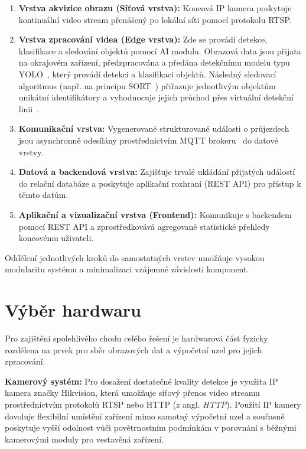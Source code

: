 \documentclass[male,czech,api_bc]{kitheses}
\begin{document}
\begin{enumerate}
    \item \textbf{Vrstva akvizice obrazu (Síťová vrstva):} Koncová IP kamera poskytuje kontinuální video stream přenášený po lokální síti pomocí protokolu \acs{RTSP}.
    \item \textbf{Vrstva zpracování videa (Edge vrstva):} Zde se provádí detekce, klasifikace a sledování objektů pomocí AI modulu. Obrazová data jsou přijata na okrajovém zařízení, předzpracována a předána detekčnímu modelu typu YOLO~\cite{redmon_yolo_2016}, který provádí detekci a klasifikaci objektů. Následný sledovací algoritmus (např. na principu SORT~\cite{SORT_original_2016}) přiřazuje jednotlivým objektům unikátní identifikátory a vyhodnocuje jejich průchod přes virtuální detekční linii~\cite{mdpi_roi_tracking_2022}.
    \item \textbf{Komunikační vrstva:} Vygenerované strukturované události o průjezdech jsou asynchronně odesílány prostřednictvím MQTT brokeru~\cite{mqtt_oasis_2019} do datové vrstvy.
    \item \textbf{Datová a backendová vrstva:} Zajišťuje trvalé ukládání přijatých událostí do relační databáze a poskytuje aplikační rozhraní (REST API) pro přístup k těmto datům.
    \item \textbf{Aplikační a vizualizační vrstva (Frontend):} Komunikuje s backendem pomocí REST API a zprostředkovává agregované statistické přehledy koncovému uživateli.
\end{enumerate}

Oddělení jednotlivých kroků do samostatných vrstev umožňuje vysokou modularitu systému a minimalizaci vzájemné závislosti komponent.

\section{Výběr hardwaru}
Pro zajištění spolehlivého chodu celého řešení je hardwarová část fyzicky rozdělena na prvek pro sběr obrazových dat a výpočetní uzel pro jejich zpracování.

\textbf{Kamerový systém:} Pro dosažení dostatečné kvality detekce je využita IP kamera značky Hikvision, která umožňuje síťový přenos video streamu prostřednictvím protokolů \acs{RTSP} nebo \acs{HTTP} (z angl. \textit{\acl{HTTP}}). Použití IP kamery dovoluje flexibilní umístění zařízení mimo samotný výpočetní uzel a současně poskytuje vyšší odolnost vůči povětrnostním podmínkám v porovnání s běžnými kamerovými moduly pro vestavěná zařízení. %
\end{document}
